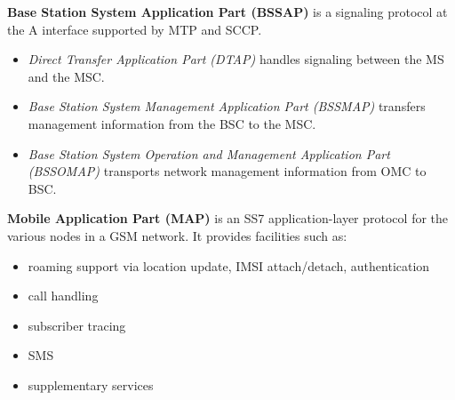  
\textbf{Base Station System Application Part (BSSAP)} is a signaling protocol
at the A interface supported by MTP and SCCP.
 \begin{itemize}[noitemsep,topsep=0pt,parsep=0pt,partopsep=0pt]
  \item \textit{Direct Transfer Application Part (DTAP)} handles signaling 
  between the MS and the MSC.
  \item \textit{Base Station System Management Application Part (BSSMAP)} 
  transfers management information from the BSC to the MSC.
  \item \textit{Base Station System Operation and Management Application Part 
  (BSSOMAP)} transports network management information from
  OMC to BSC.
 \end{itemize}


\textbf{Mobile Application Part (MAP)} is an SS7 application-layer protocol 
for the various nodes in a GSM network.
 It provides facilities such as:
  \begin{itemize}[noitemsep,topsep=0pt,parsep=0pt,partopsep=0pt]
   \item roaming support via location update, IMSI attach/detach, 
   authentication
   \item call handling
   \item subscriber tracing
   \item SMS
   \item supplementary services
  \end{itemize}



